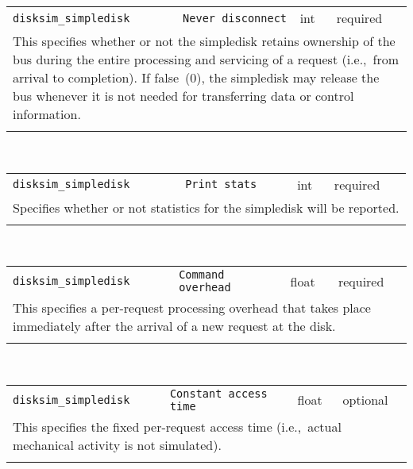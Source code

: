 \noindent 
\begin{tabular}{|p{\lpmodwidth}|p{\lpnamewidth}|p{0.5in}|p{0.5in}|}
\cline{1-4}
\texttt{disksim\_simpledisk} & \texttt{Never disconnect} & int & required \\ 
\cline{1-4}
\multicolumn{4}{|p{6in}|}{
This specifies whether or not the simpledisk retains ownership of the bus
during the entire processing and servicing of a request (i.e.,~from
arrival to completion). If false~(0), the simpledisk may release the
bus whenever it is not needed for transferring data or control
information.
}\\ 
\cline{1-4}
\multicolumn{4}{p{5in}}{}\\
\end{tabular}\\ 
\noindent 
\begin{tabular}{|p{\lpmodwidth}|p{\lpnamewidth}|p{0.5in}|p{0.5in}|}
\cline{1-4}
\texttt{disksim\_simpledisk} & \texttt{Print stats} & int & required \\ 
\cline{1-4}
\multicolumn{4}{|p{6in}|}{
Specifies whether or not statistics for the simpledisk will be reported.
}\\ 
\cline{1-4}
\multicolumn{4}{p{5in}}{}\\
\end{tabular}\\ 
\noindent 
\begin{tabular}{|p{\lpmodwidth}|p{\lpnamewidth}|p{0.5in}|p{0.5in}|}
\cline{1-4}
\texttt{disksim\_simpledisk} & \texttt{Command overhead} & float & required \\ 
\cline{1-4}
\multicolumn{4}{|p{6in}|}{
This specifies a per-request processing overhead that takes place
immediately after the arrival of a new request at the disk.
}\\ 
\cline{1-4}
\multicolumn{4}{p{5in}}{}\\
\end{tabular}\\ 
\noindent 
\begin{tabular}{|p{\lpmodwidth}|p{\lpnamewidth}|p{0.5in}|p{0.5in}|}
\cline{1-4}
\texttt{disksim\_simpledisk} & \texttt{Constant access time} & float & optional \\ 
\cline{1-4}
\multicolumn{4}{|p{6in}|}{
This specifies the fixed per-request access time (i.e.,~actual mechanical
activity is not simulated).
}\\ 
\cline{1-4}
\multicolumn{4}{p{5in}}{}\\
\end{tabular}\\ 
